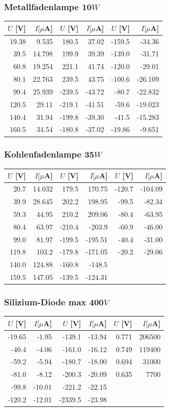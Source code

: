 \documentclass[12pt,a4paper]{article}
\begin{document}
\subsubsection*{Metallfadenlampe 10$W$}
\begin{tabular}{|r|r|r|r|r|r|}
\hline
$U$ [V]&$I [\mu $A]&$U$ [V]&$I [\mu $A]&$U$ [V]&$I [\mu $A]\\
\hline
19.38&9.535&180.5&37.02&-159.5&-34.36\\
39.5&14.798&199.9&39.39&-139.0&-31.71\\
60.8&19.254&221.1&41.74&-120.0&-29.01\\
80.1&22.763&239.5&43.75&-100.6&-26.109\\
99.4&25.939&-239.5&-43.72&-80.7&-22.832\\
120.5&29.11&-219.1&-41.51&-59.6&-19.023\\
140.4&31.94&-199.8&-39.30&-41.5&-15.283\\
160.5&34.54&-180.8&-37.02&-19.86&-9.651\\
\hline
\end{tabular}

\subsubsection*{Kohlenfadenlampe 35$W$}
\begin{tabular}{|r|r|r|r|r|r|}
\hline
$U$ [V]&$I [\mu $A]&$U$ [V]&$I [\mu $A]&$U$ [V]&$I [\mu $A]\\
\hline
20.7&14.032&179.5&170.75&-120.7&-104.09\\
39.9&28.645&202.2&198.95&-99.5&-82.34\\
59.3&44.95&210.2&209.06&-80.4&-63.95\\
80.4&63.97&-210.4&-203.9&-60.9&-46.00\\
99.0&81.97&-199.5&-195.51&-40.4&-31.00\\
119.8&103.2&-179.8&-171.05&-20.2&-29.06\\
140.0&124.88&-160.8&-148.5&&\\
159.5&147.05&-139.5&-124.31&&\\
\hline
\end{tabular}

\subsubsection*{Silizium-Diode max 400$V$}
\begin{tabular}{|r|r|r|r|r|r|}
\hline
$U$ [V]&$I [\mu $A]&$U$ [V]&$I [\mu $A]&$U$ [V]&$I [\mu $A]\\
\hline
-19.65&-1.95&-139.1&-13.94&0.771&206500\\
-40.4&-4.06&-161.0&-16.12&0.749&119400\\
-59.2&-5.94&-180.7&-18.00&0.694&31000\\
-81.0&-8.12&-200.3&-20.09&0.635&7700\\
-99.8&-10.01&-221.2&-22.15&&\\
-120.2&-12.01&-2339.5&-23.98&&\\
\hline
\end{tabular}
\end{document}
